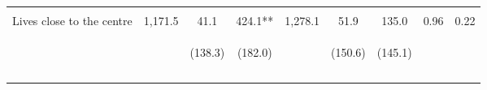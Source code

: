 \begin{tabular}{lcccccccc}
 & \begin{footnotesize}\end{footnotesize} & \begin{footnotesize}[1.000]\end{footnotesize} & \begin{footnotesize}[0.030]\end{footnotesize} & \begin{footnotesize}\end{footnotesize} & \begin{footnotesize}[1.000]\end{footnotesize} & \begin{footnotesize}[0.622]\end{footnotesize} & \begin{footnotesize}\end{footnotesize} & \begin{footnotesize}\end{footnotesize}\\
\noalign{\smallskip}Lives close to the centre & 1,171.5 & 41.1 & 424.1** & 1,278.1 & 51.9 & 135.0 & 0.96 & 0.22\\
 & \begin{footnotesize}\end{footnotesize} & \begin{footnotesize}(138.3)\end{footnotesize} & \begin{footnotesize}(182.0)\end{footnotesize} & \begin{footnotesize}\end{footnotesize} & \begin{footnotesize}(150.6)\end{footnotesize} & \begin{footnotesize}(145.1)\end{footnotesize} & \begin{footnotesize}\end{footnotesize} & \begin{footnotesize}\end{footnotesize}\\
 & \begin{footnotesize}\end{footnotesize} & \begin{footnotesize}[1.000]\end{footnotesize} & \begin{footnotesize}[0.030]\end{footnotesize} & \begin{footnotesize}\end{footnotesize} & \begin{footnotesize}[1.000]\end{footnotesize} & \begin{footnotesize}[0.622]\end{footnotesize} & \begin{footnotesize}\end{footnotesize} & \begin{footnotesize}\end{footnotesize}\\
\noalign{\smallskip}\hline\end{tabular}\\
